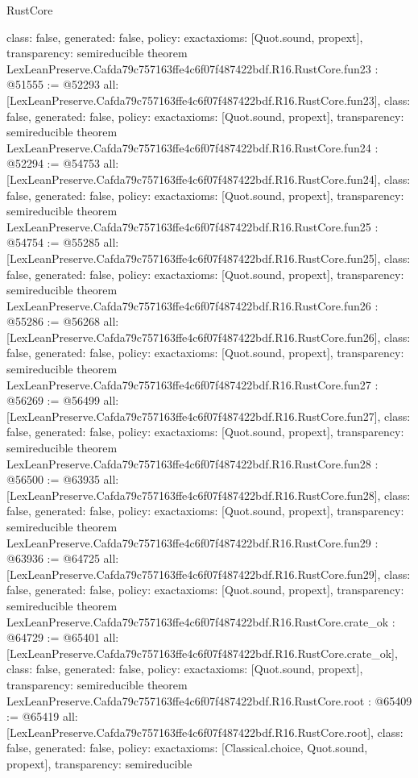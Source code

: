 \begin{lexlean}{RustCore}
\begin{coremodule}
{  class: false,
  generated: false,
  policy: exact{axioms: [Quot.sound, propext]},
  transparency: semireducible
}
theorem LexLeanPreserve.Cafda79c757163ffe4c6f07f487422bdf.R16.RustCore.fun23 : @51555 := @52293 {
  all: [LexLeanPreserve.Cafda79c757163ffe4c6f07f487422bdf.R16.RustCore.fun23],
  class: false,
  generated: false,
  policy: exact{axioms: [Quot.sound, propext]},
  transparency: semireducible
}
theorem LexLeanPreserve.Cafda79c757163ffe4c6f07f487422bdf.R16.RustCore.fun24 : @52294 := @54753 {
  all: [LexLeanPreserve.Cafda79c757163ffe4c6f07f487422bdf.R16.RustCore.fun24],
  class: false,
  generated: false,
  policy: exact{axioms: [Quot.sound, propext]},
  transparency: semireducible
}
theorem LexLeanPreserve.Cafda79c757163ffe4c6f07f487422bdf.R16.RustCore.fun25 : @54754 := @55285 {
  all: [LexLeanPreserve.Cafda79c757163ffe4c6f07f487422bdf.R16.RustCore.fun25],
  class: false,
  generated: false,
  policy: exact{axioms: [Quot.sound, propext]},
  transparency: semireducible
}
theorem LexLeanPreserve.Cafda79c757163ffe4c6f07f487422bdf.R16.RustCore.fun26 : @55286 := @56268 {
  all: [LexLeanPreserve.Cafda79c757163ffe4c6f07f487422bdf.R16.RustCore.fun26],
  class: false,
  generated: false,
  policy: exact{axioms: [Quot.sound, propext]},
  transparency: semireducible
}
theorem LexLeanPreserve.Cafda79c757163ffe4c6f07f487422bdf.R16.RustCore.fun27 : @56269 := @56499 {
  all: [LexLeanPreserve.Cafda79c757163ffe4c6f07f487422bdf.R16.RustCore.fun27],
  class: false,
  generated: false,
  policy: exact{axioms: [Quot.sound, propext]},
  transparency: semireducible
}
theorem LexLeanPreserve.Cafda79c757163ffe4c6f07f487422bdf.R16.RustCore.fun28 : @56500 := @63935 {
  all: [LexLeanPreserve.Cafda79c757163ffe4c6f07f487422bdf.R16.RustCore.fun28],
  class: false,
  generated: false,
  policy: exact{axioms: [Quot.sound, propext]},
  transparency: semireducible
}
theorem LexLeanPreserve.Cafda79c757163ffe4c6f07f487422bdf.R16.RustCore.fun29 : @63936 := @64725 {
  all: [LexLeanPreserve.Cafda79c757163ffe4c6f07f487422bdf.R16.RustCore.fun29],
  class: false,
  generated: false,
  policy: exact{axioms: [Quot.sound, propext]},
  transparency: semireducible
}
theorem LexLeanPreserve.Cafda79c757163ffe4c6f07f487422bdf.R16.RustCore.crate_ok : @64729 := @65401 {
  all: [LexLeanPreserve.Cafda79c757163ffe4c6f07f487422bdf.R16.RustCore.crate_ok],
  class: false,
  generated: false,
  policy: exact{axioms: [Quot.sound, propext]},
  transparency: semireducible
}
theorem LexLeanPreserve.Cafda79c757163ffe4c6f07f487422bdf.R16.RustCore.root : @65409 := @65419 {
  all: [LexLeanPreserve.Cafda79c757163ffe4c6f07f487422bdf.R16.RustCore.root],
  class: false,
  generated: false,
  policy: exact{axioms: [Classical.choice, Quot.sound, propext]},
  transparency: semireducible
}


\end{coremodule}
\end{lexlean}
